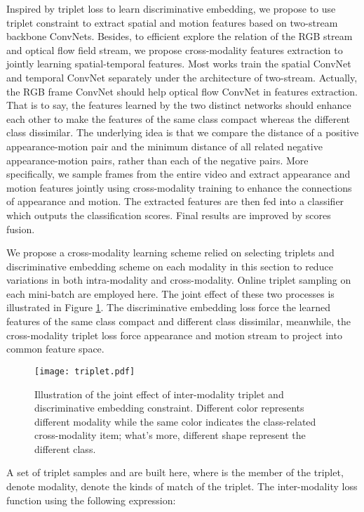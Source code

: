 \documentclass[conference,compsoc]{IEEEtran}
\begin{document}
Inspired by triplet loss to learn discriminative embedding, we propose to use triplet constraint to extract spatial and motion features based on two-stream backbone ConvNets. Besides, to efficient explore the relation of the RGB stream and optical flow field stream, we propose cross-modality features extraction to jointly learning spatial-temporal features. Most works train the spatial ConvNet and temporal ConvNet separately under the architecture of two-stream. Actually, the RGB frame ConvNet should help optical flow ConvNet in features extraction. That is to say, the features learned by the two distinct networks should enhance each other to make the features of the same class compact whereas the different class dissimilar. The underlying idea is that we compare the distance of a positive appearance-motion pair and the minimum distance of all related negative appearance-motion pairs, rather than each of the negative pairs. More specifically, we sample frames from the entire video and extract appearance and motion features jointly using cross-modality training to enhance the connections of appearance and motion. The extracted features are then fed into a classifier which outputs the classification scores. Final results are improved by scores fusion.

We propose a cross-modality learning scheme relied on selecting triplets and discriminative embedding scheme on each modality in this section to reduce variations in both intra-modality and cross-modality. Online triplet sampling on each mini-batch \cite{hermans2017defense} are employed here. The joint effect of these two processes is illustrated in Figure \ref{fig:triplet}. The discriminative embedding loss force the learned features of the same class compact and different class dissimilar, meanwhile, the cross-modality triplet loss force appearance and motion stream to project into common feature space.

\begin{figure}[h]
    \centering
    \texttt{[image: triplet.pdf]}
    \caption{Illustration of the joint effect of inter-modality triplet and discriminative embedding constraint. Different color represents different modality while the same color indicates the class-related cross-modality item; what's more, different shape represent the different class.}
    \label{fig:triplet}
\end{figure}

A set of triplet samples  and  are built here, where  is the member of the triplet,  denote modality,  denote the kinds of match of the triplet. The inter-modality loss function using the following expression:
\end{document}
